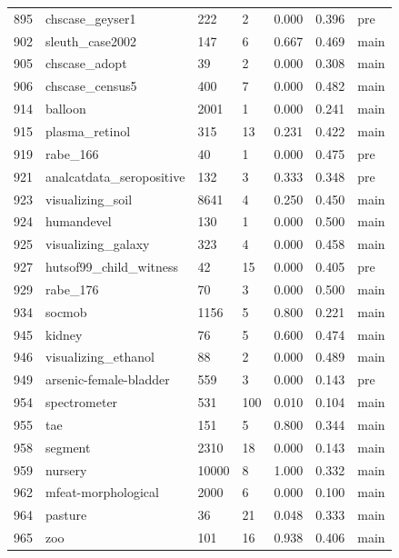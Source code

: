 \begin{table}[!htb]
\begin{tabular}{l | l | l | l | l | l | l}
895 & chscase\_geyser1 & 222 & 2 & 0.000 & 0.396 & pre \\
902 & sleuth\_case2002 & 147 & 6 & 0.667 & 0.469 & main \\
905 & chscase\_adopt & 39 & 2 & 0.000 & 0.308 & main \\
906 & chscase\_census5 & 400 & 7 & 0.000 & 0.482 & main \\
914 & balloon & 2001 & 1 & 0.000 & 0.241 & main \\
915 & plasma\_retinol & 315 & 13 & 0.231 & 0.422 & main \\
919 & rabe\_166 & 40 & 1 & 0.000 & 0.475 & pre \\
921 & analcatdata\_seropositive & 132 & 3 & 0.333 & 0.348 & pre \\
923 & visualizing\_soil & 8641 & 4 & 0.250 & 0.450 & main \\
924 & humandevel & 130 & 1 & 0.000 & 0.500 & main \\
925 & visualizing\_galaxy & 323 & 4 & 0.000 & 0.458 & main \\
927 & hutsof99\_child\_witness & 42 & 15 & 0.000 & 0.405 & pre \\
929 & rabe\_176 & 70 & 3 & 0.000 & 0.500 & main \\
934 & socmob & 1156 & 5 & 0.800 & 0.221 & main \\
945 & kidney & 76 & 5 & 0.600 & 0.474 & main \\
946 & visualizing\_ethanol & 88 & 2 & 0.000 & 0.489 & main \\
949 & arsenic-female-bladder & 559 & 3 & 0.000 & 0.143 & pre \\
954 & spectrometer & 531 & 100 & 0.010 & 0.104 & main \\
955 & tae & 151 & 5 & 0.800 & 0.344 & main \\
958 & segment & 2310 & 18 & 0.000 & 0.143 & main \\
959 & nursery & 10000 & 8 & 1.000 & 0.332 & main \\
962 & mfeat-morphological & 2000 & 6 & 0.000 & 0.100 & main \\
964 & pasture & 36 & 21 & 0.048 & 0.333 & main \\
965 & zoo & 101 & 16 & 0.938 & 0.406 & main \\
\end{tabular}
\end{table}
